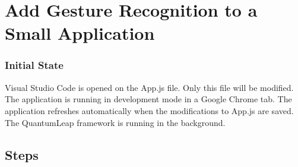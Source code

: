 \section{Add Gesture Recognition to a Small Application} \label{app:quantumleap-tasks:tasks-dev}
\subsubsection{Initial State}
Visual Studio Code is opened on the \textsf{App.js} file. Only this file will be modified. The application is running in development mode in a Google Chrome tab. The application refreshes automatically when the modifications to \textsf{App.js} are saved. The QuantumLeap framework is running in the background.

\subsection{Steps}
